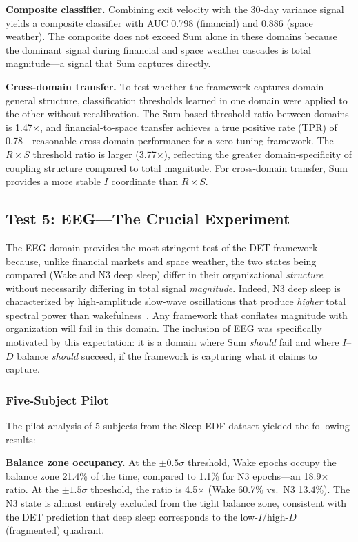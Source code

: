 \documentclass[aip,cha,reprint,amsmath,amssymb]{revtex4-2}
\begin{document}
\textbf{Composite classifier.} Combining exit velocity with the 30-day variance signal yields a composite classifier with AUC 0.798 (financial) and 0.886 (space weather). The composite does not exceed Sum alone in these domains because the dominant signal during financial and space weather cascades is total magnitude---a signal that Sum captures directly.

\textbf{Cross-domain transfer.} To test whether the framework captures domain-general structure, classification thresholds learned in one domain were applied to the other without recalibration. The Sum-based threshold ratio between domains is 1.47$\times$, and financial-to-space transfer achieves a true positive rate (TPR) of 0.78---reasonable cross-domain performance for a zero-tuning framework. The $R \times S$ threshold ratio is larger (3.77$\times$), reflecting the greater domain-specificity of coupling structure compared to total magnitude. For cross-domain transfer, Sum provides a more stable $I$ coordinate than $R \times S$.

\subsection{\label{sec:eeg}Test 5: EEG---The Crucial Experiment}

The EEG domain provides the most stringent test of the DET framework because, unlike financial markets and space weather, the two states being compared (Wake and N3 deep sleep) differ in their organizational \emph{structure} without necessarily differing in total signal \emph{magnitude}. Indeed, N3 deep sleep is characterized by high-amplitude slow-wave oscillations that produce \emph{higher} total spectral power than wakefulness~\cite{massimini2005}. Any framework that conflates magnitude with organization will fail in this domain. The inclusion of EEG was specifically motivated by this expectation: it is a domain where Sum \emph{should} fail and where $I$--$D$ balance \emph{should} succeed, if the framework is capturing what it claims to capture.

\subsubsection{Five-Subject Pilot}

The pilot analysis of 5 subjects from the Sleep-EDF dataset yielded the following results:

\textbf{Balance zone occupancy.} At the $\pm 0.5\sigma$ threshold, Wake epochs occupy the balance zone 21.4\% of the time, compared to 1.1\% for N3 epochs---an 18.9$\times$ ratio. At the $\pm 1.5\sigma$ threshold, the ratio is 4.5$\times$ (Wake 60.7\% vs.\ N3 13.4\%). The N3 state is almost entirely excluded from the tight balance zone, consistent with the DET prediction that deep sleep corresponds to the low-$I$/high-$D$ (fragmented) quadrant.
\end{document}

